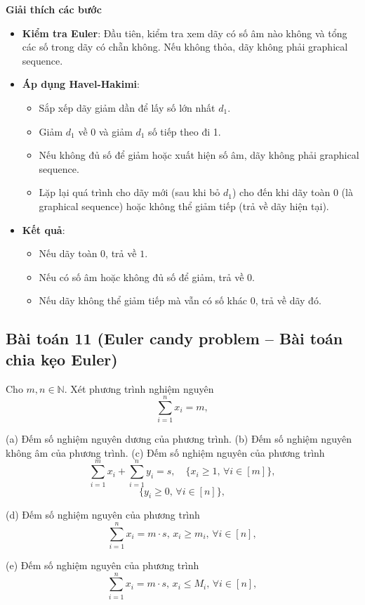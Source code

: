 \documentclass[a4paper,12pt]{article}
\begin{document}
\textbf{Giải thích các bước}
\begin{itemize}
    \item \textbf{Kiểm tra Euler}: Đầu tiên, kiểm tra xem dãy có số âm nào không và tổng các số trong dãy có chẵn không. Nếu không thỏa, dãy không phải graphical sequence.
    \item \textbf{Áp dụng Havel-Hakimi}: 
        \begin{itemize}
            \item Sắp xếp dãy giảm dần để lấy số lớn nhất \(d_1\).
            \item Giảm \(d_1\) về 0 và giảm \(d_1\) số tiếp theo đi 1.
            \item Nếu không đủ số để giảm hoặc xuất hiện số âm, dãy không phải graphical sequence.
            \item Lặp lại quá trình cho dãy mới (sau khi bỏ \(d_1\)) cho đến khi dãy toàn 0 (là graphical sequence) hoặc không thể giảm tiếp (trả về dãy hiện tại).
        \end{itemize}
    \item \textbf{Kết quả}: 
        \begin{itemize}
            \item Nếu dãy toàn 0, trả về \(1\).
            \item Nếu có số âm hoặc không đủ số để giảm, trả về \(0\).
            \item Nếu dãy không thể giảm tiếp mà vẫn có số khác 0, trả về dãy đó.
        \end{itemize}
\end{itemize}

\subsection*{Bài toán 11 (Euler candy problem – Bài toán chia kẹo Euler)}

Cho \( m, n \in \mathbb{N} \). Xét phương trình nghiệm nguyên
\[
\sum_{i=1}^{n} x_i = m,
\]

(a) Đếm số nghiệm nguyên dương của phương trình.  
(b) Đếm số nghiệm nguyên không âm của phương trình.  
(c) Đếm số nghiệm nguyên của phương trình
\[
\sum_{i=1}^{m} x_i + \sum_{i=1}^{n} y_i = s, \quad \{ x_i \geq 1, \, \forall i \in [m] \},
\]
\[
\{ y_i \geq 0, \, \forall i \in [n] \},
\]

(d) Đếm số nghiệm nguyên của phương trình
\[
\sum_{i=1}^{n} x_i = m \cdot s, \, x_i \geq m_i, \, \forall i \in [n],
\]

(e) Đếm số nghiệm nguyên của phương trình
\[
\sum_{i=1}^{n} x_i = m \cdot s, \, x_i \leq M_i, \, \forall i \in [n],
\]
\end{document}
